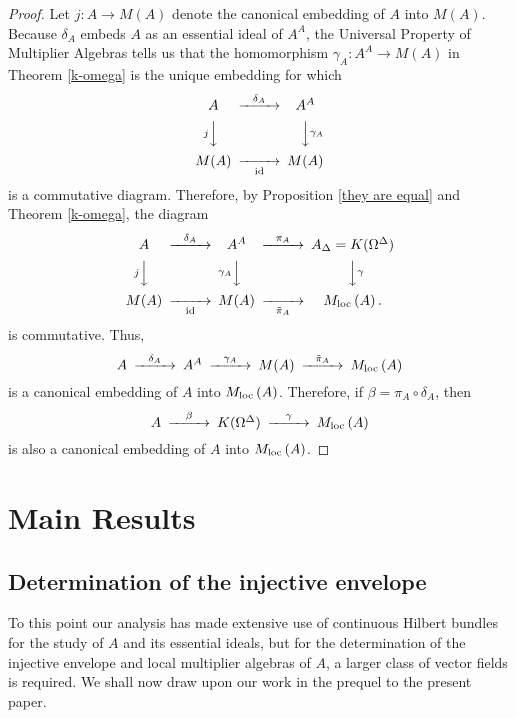 \documentclass{amsart}
\theoremstyle{definition}
\theoremstyle{remark}
\begin{document}
\begin{proof} Let $j:A\rightarrow M(A)$ denote the canonical embedding of $A$ into $M(A)$. Because
$\delta_A$ embeds $A$ as an essential ideal of $A^A$, the Universal Property of Multiplier Algebras
tells us that the homomorphism $\gamma_A:A^A\rightarrow M(A)$
in Theorem \ref{k-omega} is the unique embedding for which
\[
\begin{CD}
A   @>{\delta_A}>> A^A \\
@V{j}VV           @VV{\gamma_A}V  \\
M(A)  @ >>{\rm id}> M(A)
\end{CD}
\]
is a commutative diagram. Therefore,
by Proposition \ref{they are equal} and Theorem \ref{k-omega}, the diagram
\[
\begin{CD}
A @>\delta_A >> A^A @>\pi_A >> A_\Delta=K(\Omega^\Delta) \\
@V{j}VV           @V{\gamma_A}VV @VV{\gamma}V \\
M(A)  @ >>{\rm id}>M(A)@>>{\tilde\pi_A}> {M_{\rm loc}\,}(A)\,.
\end{CD}
\]
is commutative. Thus,
\[
\begin{CD}
A @>\delta_A >> A^A
@>\gamma_A >> M(A)
@>\tilde\pi_A>> {M_{\rm loc}\,}(A)
\end{CD}
\]
is a canonical embedding of $A$ into ${M_{\rm loc}\,}(A)$. Therefore, if $\beta=\pi_A\circ\delta_A$, then
\[
\begin{CD}
A @>\beta >> K(\Omega^\Delta)
@>\gamma>> {M_{\rm loc}\,}(A)
\end{CD}
\]
is also a canonical embedding of $A$ into ${M_{\rm loc}\,}(A)$.
\end{proof}
\section{Main Results}\label{S:main results}

\subsection{Determination of the injective envelope}

To this point our analysis has made extensive use of continuous Hilbert bundles
for the study of $A$ and its essential ideals,
but for the determination of the injective envelope and local multiplier algebras
of $A$, a larger class of vector fields is required. We shall now draw upon our
work in the prequel \cite{argerami--farenick--massey2010}  to the present paper.
\end{document}
